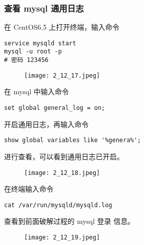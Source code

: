 \subsubsection{查看 mysql 通用日志}
在 CentOS6.5 上打开终端，输入命令
\begin{verbatim}
service mysqld start
mysql -u root -p
# 密码 123456
\end{verbatim}
\begin{figure}[H]
  \begin{center}
    \texttt{[image: 2\_12\_17.jpeg]}
  \end{center}
\end{figure}

在 mysql 中输入命令
\begin{verbatim}
set global general_log = on;
\end{verbatim}
开启通用日志，再输入命令
\begin{verbatim}
show global variables like '%genera%';
\end{verbatim}
进行查看，可以看到通用日志已开启。
\begin{figure}[H]
  \begin{center}
    \texttt{[image: 2\_12\_18.jpeg]}
  \end{center}
\end{figure}

在终端输入命令
\begin{verbatim}
cat /var/run/mysqld/mysqld.log
\end{verbatim}
查看到前面破解过程的 mysql 登录
信息。
\begin{figure}[H]
  \begin{center}
    \texttt{[image: 2\_12\_19.jpeg]}
  \end{center}
\end{figure}
